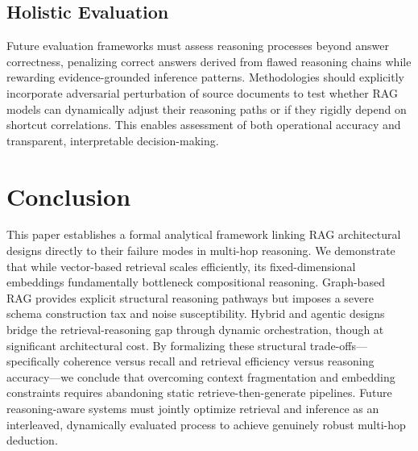 \documentclass[runningheads]{llncs}
\begin{document}
\subsection{Holistic Evaluation}

Future evaluation frameworks must assess reasoning processes beyond answer correctness, penalizing correct answers derived from flawed reasoning chains while rewarding evidence-grounded inference patterns. Methodologies should explicitly incorporate adversarial perturbation of source documents to test whether RAG models can dynamically adjust their reasoning paths or if they rigidly depend on shortcut correlations. This enables assessment of both operational accuracy and transparent, interpretable decision-making.


\section{Conclusion}

This paper establishes a formal analytical framework linking RAG architectural designs directly to their failure modes in multi-hop reasoning. We demonstrate that while vector-based retrieval scales efficiently, its fixed-dimensional embeddings fundamentally bottleneck compositional reasoning. Graph-based RAG provides explicit structural reasoning pathways but imposes a severe schema construction tax and noise susceptibility. Hybrid and agentic designs bridge the retrieval-reasoning gap through dynamic orchestration, though at significant architectural cost. By formalizing these structural trade-offs—specifically coherence versus recall and retrieval efficiency versus reasoning accuracy—we conclude that overcoming context fragmentation and embedding constraints requires abandoning static retrieve-then-generate pipelines. Future reasoning-aware systems must jointly optimize retrieval and inference as an interleaved, dynamically evaluated process to achieve genuinely robust multi-hop deduction.



\end{document}
